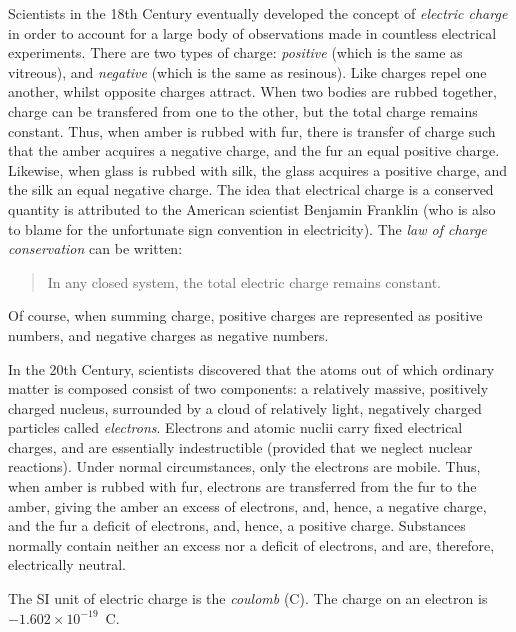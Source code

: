 Scientists in the 18th Century eventually 
 developed the concept of {\em electric charge}\/ in order to account for a large body
of 
observations made in countless electrical experiments. 
There are two types of charge: {\em positive}\/ (which is the same as vitreous), and {\em negative}\/ (which is the same as resinous). Like
charges repel one another, whilst opposite charges attract. When two bodies are
rubbed together, charge can be transfered from one to the other, but the total
charge remains constant. Thus, when amber is rubbed with fur, there is transfer of
charge such that the amber acquires a negative charge, and the fur an equal
positive charge. Likewise, when glass is rubbed with silk, the glass acquires
a positive charge, and the silk an equal negative charge. The idea that
electrical charge is a conserved quantity is attributed to the American scientist
Benjamin Franklin (who is also to blame for the unfortunate sign convention in electricity). The {\em law of  charge conservation}\/ can be written:
\begin{quote}
{\sf In any closed system, the total electric charge remains constant.}
\end{quote}
Of course, when  summing  charge, positive charges are represented as
positive numbers, and negative charges as negative numbers. 

In the 20th Century, scientists discovered that the atoms out of which ordinary matter is
composed consist of two components: a relatively massive, positively charged
nucleus, surrounded by a cloud of relatively light, negatively 
charged particles called {\em electrons}. Electrons and atomic
nuclii carry fixed electrical charges, and are essentially indestructible (provided that we neglect  nuclear reactions). 
Under normal circumstances, only 
the electrons are mobile. Thus, when amber is rubbed with fur, electrons
are transferred from the fur to the amber, giving the amber an excess of
electrons, and, hence, a negative charge, and  the fur a deficit of
electrons, and, hence, a positive charge. Substances normally
contain neither an excess nor a deficit of electrons, and are, therefore,
electrically neutral. 

The SI unit of electric charge is the {\em coulomb} (C). The charge on an
electron is $-1.602\times 10^{-19}$~C.

